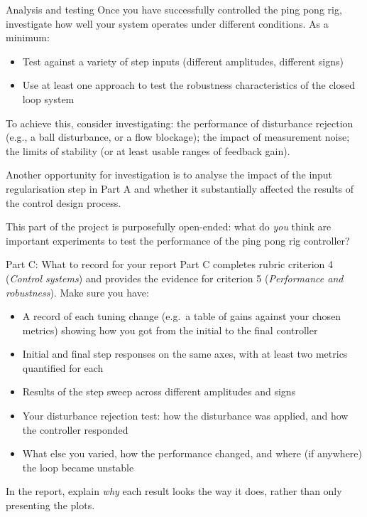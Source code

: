 \documentclass[9pt]{beamer-control}
\begin{document}
\begin{frame}{Analysis and testing}
  Once you have successfully controlled the ping pong rig, investigate how well your system operates under different conditions. As a minimum:
  \begin{itemize}
    \item Test against a variety of step inputs (different amplitudes, different signs)
    \item Use at least one approach to test the robustness characteristics of the closed loop system
  \end{itemize}
  To achieve this, consider investigating: the performance of disturbance rejection (e.g., a ball disturbance, or a flow blockage); the impact of measurement noise;   the limits of stability (or at least usable ranges of feedback gain).

  Another opportunity for investigation is to analyse the impact of the input regularisation step in Part A and whether it substantially affected the results of the control design process.

  This part of the project is purposefully open-ended: what do \emph{you} think are important experiments to test the performance of the ping pong rig controller?
\end{frame}

\begin{frame}{Part C: What to record for your report}
  Part C completes rubric criterion 4 (\emph{Control systems}) and provides the evidence for criterion 5 (\emph{Performance and robustness}). Make sure you have:
  \begin{itemize}
    \item A record of each tuning change (e.g.\ a table of gains against your chosen metrics) showing how you got from the initial to the final controller
    \item Initial and final step responses on the same axes, with at least two metrics quantified for each
    \item Results of the step sweep across different amplitudes and signs
    \item Your disturbance rejection test: how the disturbance was applied, and how the controller responded
    \item What else you varied, how the performance changed, and where (if anywhere) the loop became unstable
  \end{itemize}
  In the report, explain \emph{why} each result looks the way it does, rather than only presenting the plots.
\end{frame}
\end{document}
